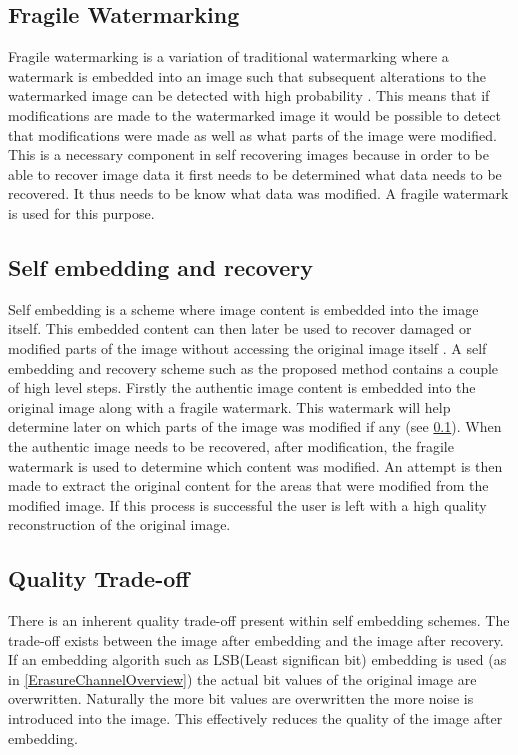 \documentclass[12pt]{article}
\begin{document}
\subsection{Fragile Watermarking}
\label{introFragWatermarking}
Fragile watermarking is a variation of traditional watermarking where a watermark is embedded into an image such that subsequent alterations to the watermarked image can be detected with high probability \cite{lin1999review}.
This means that if modifications are made to the watermarked image it would be possible to detect that modifications were made as well as what parts of the image were modified.
This is a necessary component in self recovering images because in order to be able to recover image data it first needs to be determined what data needs to be recovered.
It thus needs to be know what data was modified.
A fragile watermark is used for this purpose. 

\subsection{Self embedding and recovery}
\label{introSelfEmbedRecovery}
Self embedding is a scheme where image content is embedded into the image itself. This embedded content can then later be used to recover damaged or modified parts of the image without accessing the original image itself \cite{fridrich1999images}.
A self embedding and recovery scheme such as the proposed method contains a couple of high level steps.
Firstly the authentic image content is embedded into the original image along with a fragile watermark.
This watermark will help determine later on which parts of the image was modified if any (see \ref{introFragWatermarking}).
When the authentic image needs to be recovered, after modification, the fragile watermark is used to determine which content was modified.
An attempt is then made to extract the original content for the areas that were modified from the modified image.
If this process is successful the user is left with a high quality reconstruction of the original image.

\subsection{Quality Trade-off}
\label{introQualityTrade}
There is an inherent quality trade-off present within self embedding schemes.
The trade-off exists between the image after embedding and the image after recovery.
If an embedding algorith such as LSB(Least significan bit) embedding is used (as in \ref{ErasureChannelOverview}) the actual bit values of the original image are overwritten.
Naturally the more bit values are overwritten the more noise is introduced into the image.
This effectively reduces the quality of the image after embedding.
\end{document}
